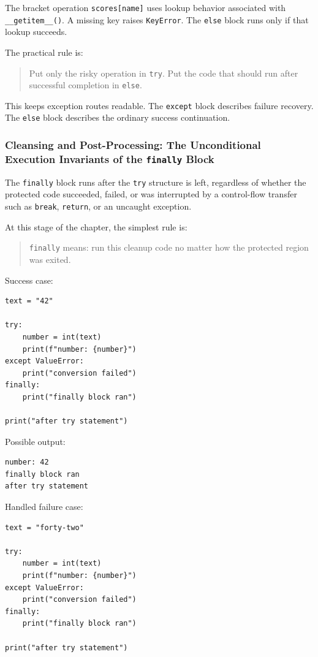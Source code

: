 The bracket operation \texttt{scores[name]} uses lookup behavior associated with \texttt{\_\_getitem\_\_()}. A missing key raises \texttt{KeyError}. The \texttt{else} block runs only if that lookup succeeds.

The practical rule is:

\begin{quote}
Put only the risky operation in \texttt{try}. Put the code that should run after successful completion in \texttt{else}.
\end{quote}

This keeps exception routes readable. The \texttt{except} block describes failure recovery. The \texttt{else} block describes the ordinary success continuation.

\subsubsection{Cleansing and Post-Processing: The Unconditional Execution Invariants of the \texttt{finally} Block}

The \texttt{finally} block runs after the \texttt{try} structure is left, regardless of whether the protected code succeeded, failed, or was interrupted by a control-flow transfer such as \texttt{break}, \texttt{return}, or an uncaught exception.

At this stage of the chapter, the simplest rule is:

\begin{quote}
\texttt{finally} means: run this cleanup code no matter how the protected region was exited.
\end{quote}

Success case:

\begin{verbatim}
text = "42"

try:
    number = int(text)
    print(f"number: {number}")
except ValueError:
    print("conversion failed")
finally:
    print("finally block ran")

print("after try statement")
\end{verbatim}

Possible output:

\begin{verbatim}
number: 42
finally block ran
after try statement
\end{verbatim}

Handled failure case:

\begin{verbatim}
text = "forty-two"

try:
    number = int(text)
    print(f"number: {number}")
except ValueError:
    print("conversion failed")
finally:
    print("finally block ran")

print("after try statement")
\end{verbatim}

